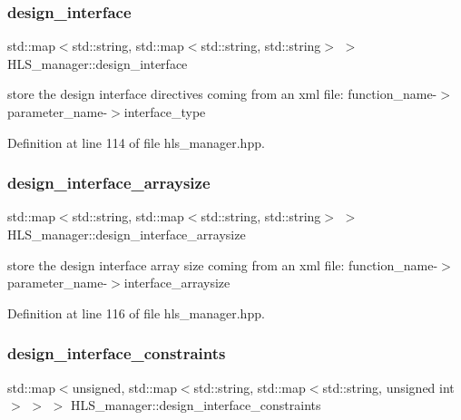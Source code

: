\subsubsection{\texorpdfstring{design\+\_\+interface}{design\_interface}}
{\footnotesize\ttfamily std\+::map$<$std\+::string, std\+::map$<$std\+::string, std\+::string$>$ $>$ H\+L\+S\+\_\+manager\+::design\+\_\+interface}



store the design interface directives coming from an xml file\+: function\+\_\+name-\/$>$parameter\+\_\+name-\/$>$interface\+\_\+type 



Definition at line 114 of file hls\+\_\+manager.\+hpp.

\mbox{\label{classHLS__manager_abd07511b7c43284d488e91b0188fc70c}} 
\subsubsection{\texorpdfstring{design\+\_\+interface\+\_\+arraysize}{design\_interface\_arraysize}}
{\footnotesize\ttfamily std\+::map$<$std\+::string, std\+::map$<$std\+::string, std\+::string$>$ $>$ H\+L\+S\+\_\+manager\+::design\+\_\+interface\+\_\+arraysize}



store the design interface array size coming from an xml file\+: function\+\_\+name-\/$>$parameter\+\_\+name-\/$>$interface\+\_\+arraysize 



Definition at line 116 of file hls\+\_\+manager.\+hpp.

\mbox{\label{classHLS__manager_af8513cdb4d4acde603c9c9a84b42c19f}} 
\subsubsection{\texorpdfstring{design\+\_\+interface\+\_\+constraints}{design\_interface\_constraints}}
{\footnotesize\ttfamily std\+::map$<$unsigned, std\+::map$<$std\+::string, std\+::map$<$std\+::string, unsigned int$>$ $>$ $>$ H\+L\+S\+\_\+manager\+::design\+\_\+interface\+\_\+constraints}



